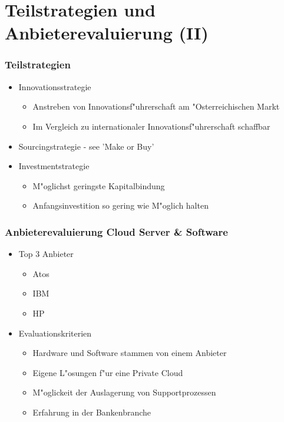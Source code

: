 \documentclass{beamer}
\begin{document}
\section{Teilstrategien und Anbieterevaluierung (II)}

\begin{frame}
  \frametitle{Teilstrategien}
  \begin{itemize}

	\item Innovationsstrategie
		\begin{itemize}
			\item Anstreben von Innovationsf"uhrerschaft am "Osterreichischen Markt
			\item Im Vergleich zu internationaler Innovationsf"uhrerschaft schaffbar\vspace{2mm}
		\end{itemize}
	\item Sourcingstrategie - see 'Make or Buy'\vspace{2mm}
	\item Investmentstrategie
		\begin{itemize}
			\item M"oglichst geringste Kapitalbindung
			\item Anfangsinvestition so gering wie M"oglich halten 
		\end{itemize}			
	
  \end{itemize}
\end{frame}

\begin{frame}
  \frametitle{Anbieterevaluierung Cloud Server \& Software}
  \begin{itemize}

	\item Top 3 Anbieter
		\begin{itemize}
			\item Atos
			\item IBM
			\item HP\vspace{2mm}
		\end{itemize}
	
	\item Evaluationskriterien
		\begin{itemize}
			\item Hardware und Software stammen von einem Anbieter 
			\item Eigene L"osungen f"ur eine Private Cloud
			\item M"oglickeit der Auslagerung von Supportprozessen
			\item Erfahrung in der Bankenbranche
		\end{itemize}	

  \end{itemize}
\end{frame}
\end{document}
